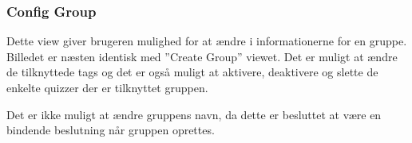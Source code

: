 \subsubsection{Config Group}
Dette view giver brugeren mulighed for at ændre i informationerne for en gruppe. Billedet er næsten identisk med ''Create Group'' viewet. Det er muligt at ændre de tilknyttede tags og det er også muligt at aktivere, deaktivere og slette de enkelte quizzer der er tilknyttet gruppen.

Det er ikke muligt at ændre gruppens navn, da dette er besluttet at være en bindende beslutning når gruppen oprettes.

